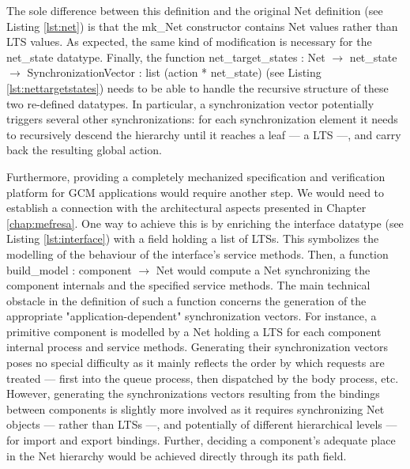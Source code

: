 	\noindent The sole difference between this definition and the original \textsf{Net}
	definition (see Listing \ref{lst:net}) is that the \textsf{mk\_Net} constructor
	contains \textsf{Net} values rather than \textsf{LTS} values. As expected, the same kind
	of modification is necessary for the \textsf{net\_state} datatype. Finally,
	the function 
	\textsf{net\_target\_states : Net $\rightarrow$ net\_state $\rightarrow$ SynchronizationVector : 
	list (action * net\_state)} (see Listing \ref{lst:nettargetstates}) 
	needs to be able to handle the recursive structure of these two
	re-defined datatypes. In particular, a synchronization vector potentially triggers 
	several other synchronizations: for each synchronization element it needs to recursively
	descend the hierarchy until it reaches a leaf --- a \textsf{LTS} ---, and carry back the 
	resulting global \textsf{action}. 
	
	
	Furthermore, providing a completely mechanized specification and verification platform for \textsc{GCM}
	applications would require another step. We would need to establish a connection
	with the architectural aspects presented in Chapter \ref{chap:mefresa}. One way to achieve this
	is by enriching the \textsf{interface} datatype (see Listing \ref{lst:interface}) with
	a field holding a list of \textsf{LTS}s. This symbolizes the modelling 
	of the behaviour of the \textsf{interface}'s service methods. Then, a function
	\textsf{build\_model : component $\rightarrow$ Net} would compute a \textsf{Net}
	synchronizing the component internals and the specified service methods. The main
	technical obstacle in the definition of such a function concerns the generation
	of the appropriate "application-dependent" synchronization vectors. For instance, a primitive \textsf{component} is 
	modelled by a \textsf{Net} holding a \textsf{LTS} for each \textsf{component} internal process
	and service methods. Generating their synchronization vectors poses no special difficulty as
	it mainly reflects the order by which requests are treated --- first into the \textsf{queue} process, 
	then 	dispatched by the \textsf{body} process, etc.
	However, generating the synchronizations vectors resulting from the 
	\textsf{binding}s between \textsf{component}s is slightly more involved as it requires
	synchronizing \textsf{Net} objects --- rather than \textsf{LTS}s ---, and 
	potentially of different hierarchical levels --- for \textsf{import} and \textsf{export} 
	\textsf{bindings}. Further, deciding a 
	\textsf{component}'s adequate place in the \textsf{Net}
	hierarchy would be achieved directly through its \textsf{path} field.	
			
